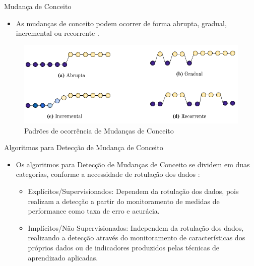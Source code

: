 \documentclass[10pt]{beamer}
\begin{document}
\begin{frame}{Mudança de Conceito}
    \begin{itemize}
        \item<1 -> As mudanças de conceito podem ocorrer de forma \alert{abrupta}, \alert{gradual}, \alert{incremental} ou \alert{recorrente} \cite{Zliobaite:2010}.
    \end{itemize}
    \begin{figure}[H]
        \begin{center}
            \includegraphics[scale=0.5]{imagens/concept_drift_patterns.png}
            \caption{Padrões de ocorrência de Mudanças de Conceito}
            \label{fig:concept_drift_patterns}
        \end{center}
    \end{figure}
\end{frame}

\begin{frame}{Algoritmos para Detecção de Mudança de Conceito}
    \begin{itemize}
        \item<1 -> Os algoritmos para Detecção de Mudanças de Conceito se dividem em duas categorias, conforme a necessidade de rotulação dos dados \cite{Zliobaite:2010}:
        \begin{itemize}
        \item<2 -> \alert{Explícitos/Supervisionados}: Dependem da rotulação dos dados, pois realizam a detecção a partir do monitoramento de medidas de performance como taxa de erro e acurácia.
        \item<3 -> \alert{Implícitos/Não Supervisionados}: Independem da rotulação dos dados, realizando a detecção através do monitoramento de características dos próprios dados ou de indicadores produzidos pelas técnicas de aprendizado aplicadas.
        \end{itemize}
    \end{itemize}
\end{frame}
\end{document}
